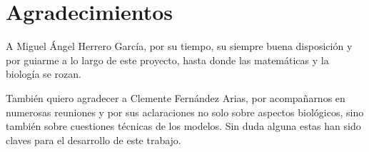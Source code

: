 
\chapter*{Agradecimientos}

A Miguel Ángel Herrero García, por su tiempo, su siempre buena disposición y por guiarme a lo largo de este proyecto, hasta donde las matemáticas y la biología se rozan. 

También quiero agradecer a Clemente Fernández Arias, por acompañarnos en numerosas reuniones y por sus aclaraciones no solo sobre aspectos biológicos, sino también sobre cuestiones técnicas de los modelos. Sin duda alguna estas han sido claves para el desarrollo de este trabajo. 








